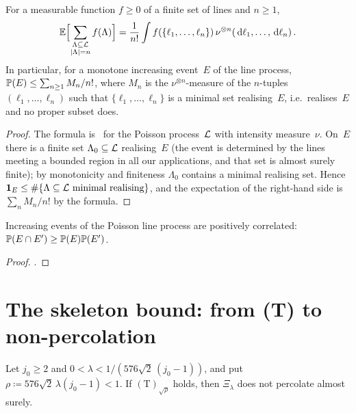 \documentclass[11pt,letterpaper]{article}
\begin{document}
\begin{lemma}
\label{lem:mecke}
For a measurable function $f\ge0$ of a finite set of lines and $n\ge1$,
\begin{equation*}
  \E\Bigl[\sum_{\substack{\Lambda\subseteq\cL\\ \lvert\Lambda\rvert=n}}f(\Lambda)\Bigr]=\frac1{n!}\int f(\{\ell_1,\dots,\ell_n\})\,\nu^{\otimes n}(\dd\ell_1,\dots,\dd\ell_n)\,.
\end{equation*}
In particular, for a monotone increasing event~$E$ of the line process, $\P(E)\le\sum_{n\ge1}M_n/n!$, where $M_n$ is the $\nu^{\otimes n}$-measure of the $n$-tuples $(\ell_1,\dots,\ell_n)$ such that $\{\ell_1,\dots,\ell_n\}$ is a minimal set realising~$E$, i.e.\ realises~$E$ and no proper subset does.
\end{lemma}

\begin{proof}
The formula is~\cite[Theorem~4.4]{LP17} for the Poisson process~$\cL$ with intensity measure~$\nu$. On~$E$ there is a finite set $\Lambda_0\subseteq\cL$ realising~$E$ (the event is determined by the lines meeting a bounded region in all our applications, and that set is almost surely finite); by monotonicity and finiteness $\Lambda_0$ contains a minimal realising set. Hence $\1_E\le\#\{\Lambda\subseteq\cL\text{ minimal realising}\}$, and the expectation of the right-hand side is $\sum_nM_n/n!$ by the formula.
\end{proof}

\begin{lemma}
\label{lem:harris}
Increasing events of the Poisson line process are positively correlated: $\P(E\cap E')\ge\P(E)\P(E')$.
\end{lemma}

\begin{proof}
\cite[Theorem~20.4]{LP17}.
\end{proof}

\section{The skeleton bound: from (T) to non-percolation}
\label{sec:skeleton}

\begin{theorem}
\label{thm:skeleton}
Let $j_0\ge2$ and $0<\lambda<1/(576\sqrt2\,(j_0-1))$, and put $\rho\coloneqq576\sqrt2\,\lambda(j_0-1)<1$. If $\mathrm{(T)}_{\sqrt\rho}$ holds, then $\Xi_\lambda$ does not percolate almost surely.
\end{theorem}
\end{document}
